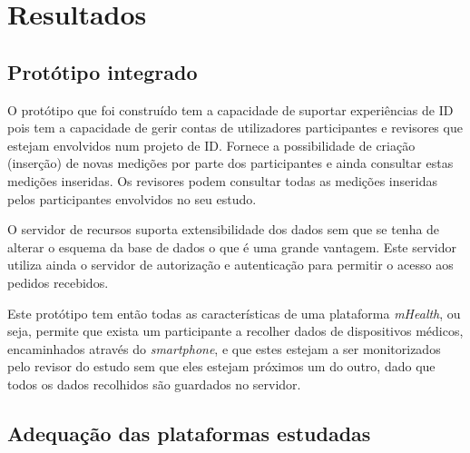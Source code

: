 \chapter{Resultados}
\section{Protótipo integrado}

O protótipo que foi construído tem a capacidade de suportar experiências de \gls{ID} pois tem a capacidade de gerir contas de utilizadores participantes e revisores que estejam envolvidos num projeto de \gls{ID}. Fornece a possibilidade de criação (inserção) de novas medições por parte dos participantes e ainda consultar estas medições inseridas. Os revisores podem consultar todas as medições inseridas pelos participantes envolvidos no seu estudo.\par
O servidor de recursos suporta extensibilidade dos dados sem que se tenha de alterar o esquema da base de dados o que é uma grande vantagem. Este servidor utiliza ainda o servidor de autorização e autenticação para permitir o acesso aos pedidos recebidos. \par
Este protótipo tem então todas as características de uma plataforma \textit{mHealth}, ou seja, permite que exista um participante a recolher dados de dispositivos médicos, encaminhados através do \textit{smartphone}, e que estes estejam a ser monitorizados pelo revisor do estudo sem que eles estejam próximos um do outro, dado que todos os dados recolhidos são guardados no servidor.

\section{Adequação das plataformas estudadas}

